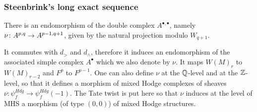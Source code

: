 \documentclass[../main.tex]{subfiles}
\begin{document}
\subsubsection{Steenbrink's long exact sequence}

There is an endomorphism of the double complex $A^{\bullet,\bullet}$, namely $\nu\colon A^{p,q} \to A^{p-1,q+1}$,  given by the natural projection modulo $W_{q+1}$.

\begin{center}
\centerline{
}
\end{center}
It commutes with $d_>$ and $d_\wedge$, therefore it induces an endomorphism of the associated simple complex $A^\bullet$ which we also denote by $\nu$. It maps $W(M)_r$ to $W(M)_{r-2}$ and $F^p$ to $F^{p-1}$. One can also define $\nu$ at the $\mathbb{Q}$-level and at the $\mathbb{Z}$-level, so that it defines a morphism of mixed Hodge complexes of sheaves $\nu \colon \psi^{Hdg}_f \to \psi^{Hdg}_f(-1)$. The Tate twist is put here so that $\nu$ induces at the level of MHS a morphism (of type $(0,0)$) of mixed Hodge structures.
\end{document}
